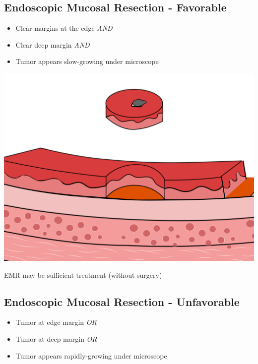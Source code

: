 \documentclass[
  letterpaper,
  DIV=11,
  numbers=noendperiod]{scrartcl}
\providecommand{\tightlist}{%
  \setlength{\itemsep}{0pt}\setlength{\parskip}{0pt}}\usepackage{longtable,booktabs,array}
\begin{document}
\subsection{Endoscopic Mucosal Resection -
Favorable}\label{endoscopic-mucosal-resection---favorable-1}

\begin{itemize}
\tightlist
\item
  Clear margins at the edge \emph{AND}
\item
  Clear deep margin \emph{AND}
\item
  Tumor appears slow-growing under microscope
\end{itemize}

\includegraphics{christmas2004_files/mediabag/emr_favorable_160012.png}

EMR may be sufficient treatment (without surgery)

\subsection{Endoscopic Mucosal Resection -
Unfavorable}\label{endoscopic-mucosal-resection---unfavorable}

\begin{itemize}
\tightlist
\item
  Tumor at edge margin \emph{OR}
\item
  Tumor at deep margin \emph{OR}
\item
  Tumor appears rapidly-growing under microscope
\end{itemize}
\end{document}
